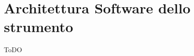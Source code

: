 \chapter{Architettura Software dello strumento}
\label{capitolo4}
\thispagestyle{empty}

\noindent ToDO
